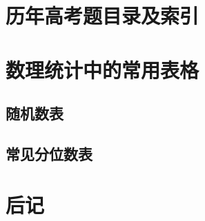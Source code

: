 \documentclass[fontset=none]{ctexbook} %
\theoremstyle{plain}
\numberwithin{equation}{subsection}%
\numberwithin{figure}{subsection}
\begin{document}
\appendix
\chapter{历年高考题目录及索引}



















\chapter{数理统计中的常用表格}
\section{随机数表}
\section{常见分位数表}


\backmatter
\chapter{后记}


\printindex
\end{document}
